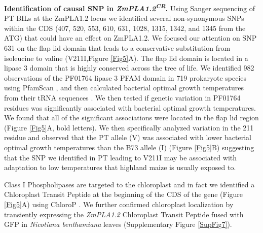 \documentclass[9pt,twocolumn,twoside,lineno]{BioRxiv}
\begin{document}
\textbf{Identification of causal SNP in \textit{ZmPLA1.2\textsuperscript{CR}}.} Using Sanger sequencing of PT BILs at the ZmPLA1.2 locus we identified several non-synonymous SNPs within the CDS (407, 520, 553, 610, 631, 1028, 1315, 1342, and 1345 from the ATG) that could have an effect on ZmPLA1.2.
We focused our attention on SNP 631 on the flap lid domain that leads to a conservative substitution from isoleucine to valine (V211I,Figure \ref{Fig5}A).  
The flap lid domain is located in a lipase 3 domain that is highly conserved across the tree of life. 
We identified 982 observations of the PF01764 lipase 3 PFAM domain in 719 prokaryote species using PfamScan \cite{Potter2018-tk, El-Gebali2019-pw}, and then calculated bacterial optimal growth temperatures from their tRNA sequences \cite{Cimen2020-dm}.
We then tested if genetic variation in PF01764 residues was significantly associated with bacterial optimal growth temperatures. 
We found that all of the significant associations were located in the flap lid region  (Figure \ref{Fig5}A, bold letters).  
We then specifically analyzed variation in the 211 residue and observed that the PT allele (V) was associated with lower bacterial optimal growth temperatures than the B73 allele (I) (Figure \ref{Fig5}B) suggesting that the SNP we identified in PT leading to V211I may be associated with adaptation to low temperatures that highland maize is usually exposed to.

Class I Phospholipases are targeted to the chloroplast and in fact we identified a Chloroplast Transit Peptide at the beginning of the CDS of the gene (Figure \ref{Fig5}A) using ChloroP \cite{Emanuelsson1999-rs}.
We further confirmed chloroplast localization by transiently expressing  the \textit{ZmPLA1.2} Chloroplast Transit Peptide fused with GFP in \textit{Nicotiana benthamiana} leaves (Supplementary Figure \ref{SupFig7}).
\end{document}
